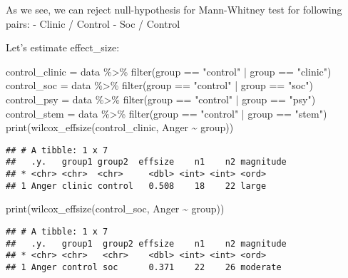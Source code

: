 \documentclass[
]{article}
\newenvironment{Shaded}{\begin{snugshade}}{\end{snugshade}}
\newcommand{\FunctionTok}[1]{\textcolor[rgb]{0.00,0.00,0.00}{#1}}
\newcommand{\NormalTok}[1]{#1}
\newcommand{\OtherTok}[1]{\textcolor[rgb]{0.56,0.35,0.01}{#1}}
\newcommand{\SpecialCharTok}[1]{\textcolor[rgb]{0.00,0.00,0.00}{#1}}
\newcommand{\StringTok}[1]{\textcolor[rgb]{0.31,0.60,0.02}{#1}}
\begin{document}
As we see, we can reject null-hypothesis for Mann-Whitney test for
following pairs: - Clinic / Control - Soc / Control

Let's estimate effect\_size:

\begin{Shaded}
\begin{Highlighting}[]
\NormalTok{control\_clinic }\OtherTok{=}\NormalTok{ data }\SpecialCharTok{\%\textgreater{}\%} \FunctionTok{filter}\NormalTok{(group }\SpecialCharTok{==} \StringTok{"control"} \SpecialCharTok{|}\NormalTok{ group }\SpecialCharTok{==} \StringTok{"clinic"}\NormalTok{)}
\NormalTok{control\_soc }\OtherTok{=}\NormalTok{ data }\SpecialCharTok{\%\textgreater{}\%} \FunctionTok{filter}\NormalTok{(group }\SpecialCharTok{==} \StringTok{"control"} \SpecialCharTok{|}\NormalTok{ group }\SpecialCharTok{==} \StringTok{"soc"}\NormalTok{)}
\NormalTok{control\_psy }\OtherTok{=}\NormalTok{ data }\SpecialCharTok{\%\textgreater{}\%} \FunctionTok{filter}\NormalTok{(group }\SpecialCharTok{==} \StringTok{"control"} \SpecialCharTok{|}\NormalTok{ group }\SpecialCharTok{==} \StringTok{"psy"}\NormalTok{)}
\NormalTok{control\_stem }\OtherTok{=}\NormalTok{ data }\SpecialCharTok{\%\textgreater{}\%} \FunctionTok{filter}\NormalTok{(group }\SpecialCharTok{==} \StringTok{"control"} \SpecialCharTok{|}\NormalTok{ group }\SpecialCharTok{==} \StringTok{"stem"}\NormalTok{)}
\FunctionTok{print}\NormalTok{(}\FunctionTok{wilcox\_effsize}\NormalTok{(control\_clinic, Anger }\SpecialCharTok{\textasciitilde{}}\NormalTok{ group))}
\end{Highlighting}
\end{Shaded}

\begin{verbatim}
## # A tibble: 1 x 7
##   .y.   group1 group2  effsize    n1    n2 magnitude
## * <chr> <chr>  <chr>     <dbl> <int> <int> <ord>    
## 1 Anger clinic control   0.508    18    22 large
\end{verbatim}

\begin{Shaded}
\begin{Highlighting}[]
\FunctionTok{print}\NormalTok{(}\FunctionTok{wilcox\_effsize}\NormalTok{(control\_soc, Anger }\SpecialCharTok{\textasciitilde{}}\NormalTok{ group))}
\end{Highlighting}
\end{Shaded}

\begin{verbatim}
## # A tibble: 1 x 7
##   .y.   group1  group2 effsize    n1    n2 magnitude
## * <chr> <chr>   <chr>    <dbl> <int> <int> <ord>    
## 1 Anger control soc      0.371    22    26 moderate
\end{verbatim}
\end{document}
